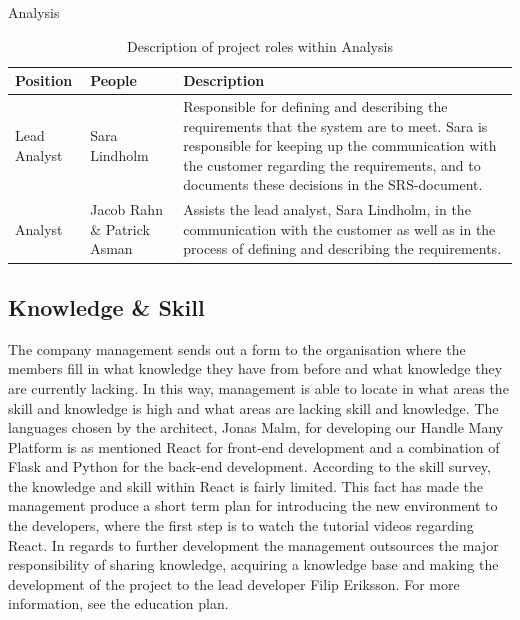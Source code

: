 \begin{table}[!hbtp]

\begin{center}
\begin{huge}
    Analysis
\end{huge}
\begin{tabular}{ | m{4cm} |m{3cm} |m{10cm}| } 
\hline
\textbf{Position} & \textbf{People} & \textbf{Description} \\ 
\hline
Lead Analyst & Sara Lindholm & Responsible for defining and describing the requirements that the system are to meet. Sara is responsible for keeping up the communication with the customer regarding the requirements, and to documents these decisions in the SRS-document.  \\
\hline
Analyst & Jacob Rahn \& Patrick Asman & Assists the lead analyst, Sara Lindholm, in the communication with the customer as well as in the process of defining and describing the requirements. \\
\hline
\end{tabular}


\end{center}
\caption{\label{tab:table-name}Description of project roles within Analysis}

\end{table}

\subsection{Knowledge \& Skill}
The company management sends out a form to the organisation where the members fill in what knowledge they have from before and what knowledge they are currently lacking. In this way, management is able to locate in what areas the skill and knowledge is high and what areas are lacking skill and knowledge. The languages chosen by the architect, Jonas Malm, for developing our Handle Many Platform is as mentioned React for front-end development and a combination of Flask and Python for the back-end development. According to the skill survey, the knowledge and skill within React is fairly limited. This fact has made the management produce a short term plan for introducing the new environment to the developers, where the first step is to watch the tutorial videos regarding React. In regards to further development the management outsources the major responsibility of sharing knowledge, acquiring a knowledge base and making the development of the project to the lead developer Filip Eriksson. For more information, see the education plan. 

